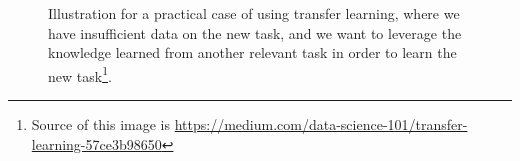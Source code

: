 \begin{figure}[!htbp]
  \centering
  \caption{Illustration for a practical case of using transfer learning, where we have insufficient data on the new task, and we want to leverage the knowledge learned from another relevant task in order to learn the new task\footnote{Source of this image is \url{https://medium.com/data-science-101/transfer-learning-57ce3b98650}}.}
  \label{fig:illustrate_TL}
\end{figure}

